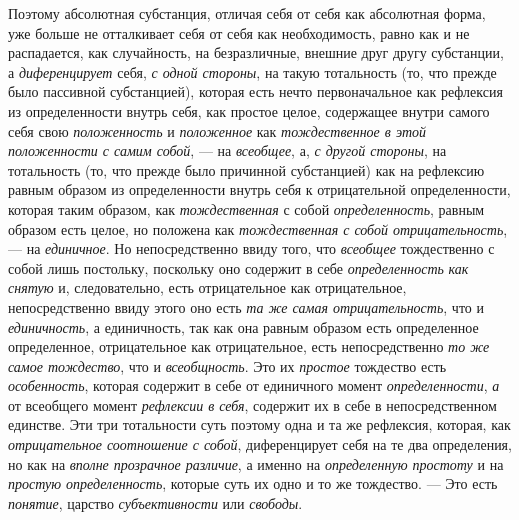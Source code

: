 Поэтому абсолютная субстанция, отличая себя от себя как абсолютная форма,
уже больше не отталкивает себя от себя как необходимость, равно как и не
распадается, как случайность, на безразличные, внешние друг другу
субстанции, а {\em диференцирует} себя,
{\em с одной стороны}, на такую тотальность (то, что
прежде было пассивной субстанцией), которая есть нечто первоначальное как
рефлексия из определенности внутрь себя, как простое целое, содержащее
внутри самого себя свою {\em положенность} и
{\em положенное} как
{\em тождественное в этой положенности с самим собой},
— на {\em всеобщее}, а, {\em с
другой стороны}, на тотальность (то, что прежде было причинной субстанцией)
как на рефлексию равным образом из определенности внутрь себя к
отрицательной определенности, которая таким образом, как
{\em тождественная} с собой
{\em определенность}, равным образом есть целое, но
положена как {\em тождественная с собой
отрицательность},— на {\em единичное}. Но
непосредственно ввиду того, что {\em всеобщее}
тождественно с собой лишь постольку, поскольку оно содержит в себе
{\em определенность} {\em как
снятую} и, следовательно, есть отрицательное как отрицательное,
непосредственно ввиду этого оно есть {\em та же самая
отрицательность}, что и {\em единичность}, а
единичность, так как она равным образом есть определенное определенное,
отрицательное как отрицательное, есть непосредственно
{\em то же самое тождество}, что и
{\em всеобщность}. Это их
{\em простое} тождество есть
{\em особенность}, которая содержит в себе от
единичного момент {\em определенности},
{\em а} от всеобщего момент
{\em рефлексии в себя}, содержит их в себе в
непосредственном единстве. Эти три тотальности суть поэтому одна и та же
рефлексия, которая, как {\em отрицательное соотношение
с собой}, диференцирует себя на те два определения, но как на
{\em вполне прозрачное различие}, а именно на
{\em определенную простоту} и на
{\em простую определенность}, которые суть их одно и то
же тождество. — Это есть {\em понятие}, царство
{\em субъективности} или
{\em свободы}.


\bigskip

